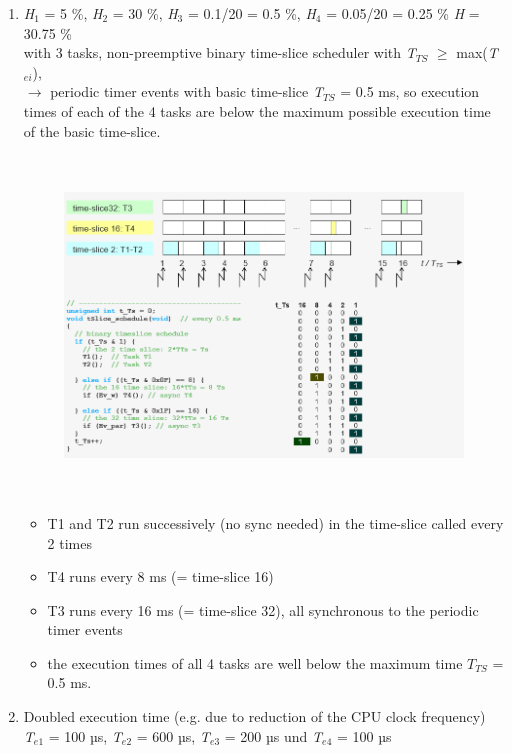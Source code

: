 \begin{enumerate}
\item \textit{H}${}_{1}$ = 5 \%, \textit{H}${}_{2}$ = 30 \%, \textit{H}${}_{3}$ = 0.1/20 = 0.5 \%, \textit{H}${}_{4}$ = 0.05/20 = 0.25 \%  \textit{H} = 30.75 \%\\

with 3 tasks, non-preemptive binary time-slice scheduler with \textit{T${}_{TS}$} $\mathrm{\ge}$ max(\textit{T${}_{ei}$}), \\
$\rightarrow$ periodic timer events with basic time-slice\textit{ T${}_{TS}$} = 0.5 ms, so execution times of each of the 4 tasks are below the maximum possible execution time of the basic time-slice.\\
 
 	\begin{figure}[h]
    \centering
    \includegraphics[width=14cm, height=9cm]{Images/image156.png}
    \label{fig:Fig 107}
    \end{figure}
    
\begin{itemize}
\item T1 and T2 run successively (no sync needed) in the time-slice called every 2 times
\item T4 runs every 8 ms (= time-slice 16)
\item T3 runs every 16 ms (= time-slice 32), all synchronous to the periodic timer events
\item the execution times of all 4 tasks are well below the maximum time $T_{TS}$ = 0.5 ms.
\end{itemize}

\item  Doubled execution time (e.g. due to reduction of the CPU clock frequency)\\  \textit{T}${}_{e1}$ = 100 µs, \textit{T}${}_{e2}$ = 600 µs, \textit{T}${}_{e3}$ = 200 µs und \textit{T}${}_{e4}$ = 100 µs\textit{ }\\


\end{enumerate}
